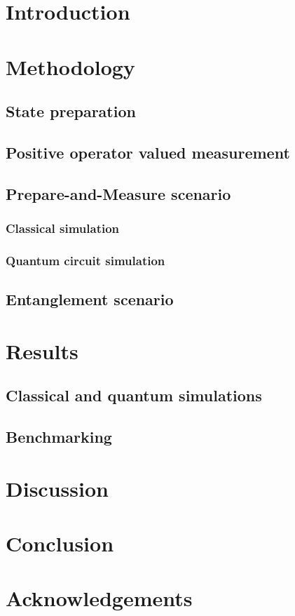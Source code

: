 \documentclass{article}
\begin{document}

\newpage

\newpage
\tableofcontents

\newpage
\section{Introduction}


\section{Methodology}
\subsection{State preparation}
\subsection{Positive operator valued measurement}
\subsection{Prepare-and-Measure scenario}
\subsubsection{Classical simulation}
\subsubsection{Quantum circuit simulation}

\subsection{Entanglement scenario}
\section{Results}
\subsection{Classical and quantum simulations}
\subsection{Benchmarking}
\section{Discussion}
\section{Conclusion}
\section{Acknowledgements}


\printbibliography
\end{document}
